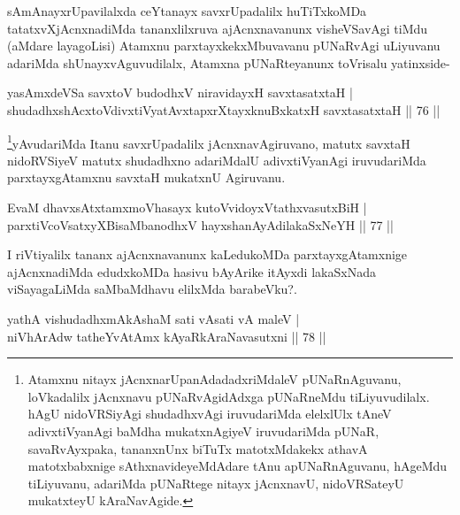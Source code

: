 \begin{artha}
sAmAnayxrUpavilalxda ceYtanayx savxrUpadalilx huTiTxkoMDa tatatxvXjAcnxnadiMda tananxlilxruva ajAcnxnavanunx visheVSavAgi tiMdu (aMdare layagoLisi) Atamxnu parxtayxkekxMbuvavanu pUNaRvAgi uLiyuvanu adariMda shUnayxvAguvudilalx, Atamxna pUNaRteyanunx toVrisalu yatinxside-
\end{artha}


\begin{shl}
yasAmxdeVSa savxtoV budodhxV niravidayxH savxtasatxtaH |\\
shudadhxshAcxtoV\s divxtiVyatAvxtapxrXtayxknuBxkatxH savxtasatxtaH \hfill || 76 ||
\end{shl}

\begin{artha}
\footnote{Atamxnu nitayx jAcnxnarUpanAdadadxriMdaleV pUNaRnAguvanu, loVkadalilx jAcnxnavu pUNaRvAgidAdxga pUNaRneMdu tiLiyuvudilalx. hAgU nidoVRSiyAgi shudadhxvAgi iruvudariMda elelxlUlx tAneV adivxtiVyanAgi baMdha mukatxnAgiyeV iruvudariMda pUNaR, savaRvAyxpaka, tananxnUnx biTuTx matotxMdakekx athavA matotxbabxnige sAthxnavideyeMdAdare tAnu apUNaRnAguvanu, hAgeMdu tiLiyuvanu, adariMda pUNaRtege nitayx jAcnxnavU, nidoVRSateyU mukatxteyU kAraNavAgide.}yAvudariMda Itanu savxrUpadalilx jAcnxnavAgiruvano, matutx savxtaH nidoRVSiyeV matutx shudadhxno adariMdalU adivxtiVyanAgi iruvudariMda parxtayxgAtamxnu savxtaH mukatxnU Agiruvanu.
\end{artha}%

\begin{shl}
EvaM dhavxsAtxtamxmoVhasayx kutoV\s vidoyxVtathxvasutxBiH |\\
parxtiVcoV\s satxyXBisaMbanodhxV hayxshanAyAdilakaSxNeYH \hfill || 77 ||
\end{shl}

\begin{artha}
I riVtiyalilx tananx ajAcnxnavanunx kaLedukoMDa parxtayxgAtamxnige ajAcnxnadiMda edudxkoMDa hasivu bAyArike itAyxdi lakaSxNada viSayagaLiMda saMbaMdhavu elilxMda barabeVku?.
\end{artha}


\begin{shl}
yathA vishudadhxmAkAshaM sati vA\s sati vA maleV |\\
niVhArAdw tatheYvA\s \s tAmx kAyaRkAraNavasutxni \hfill || 78 ||
\end{shl}


